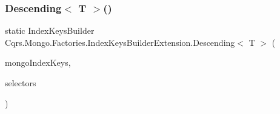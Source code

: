 \subsubsection{\texorpdfstring{Descending$<$ T $>$()}{Descending< T >()}}
{\footnotesize\ttfamily static Index\+Keys\+Builder Cqrs.\+Mongo.\+Factories.\+Index\+Keys\+Builder\+Extension.\+Descending$<$ T $>$ (\begin{DoxyParamCaption}\item[{this Index\+Keys\+Builder}]{mongo\+Index\+Keys,  }\item[{params Expression$<$ Func$<$ T, object $>$$>$ \mbox{[}$\,$\mbox{]}}]{selectors }\end{DoxyParamCaption})\hspace{0.3cm}{\ttfamily [static]}}

